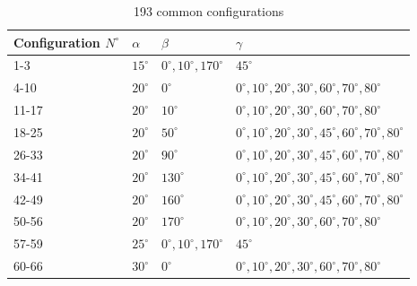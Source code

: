 \begin{table}[h]
    \centering
    \footnotesize
    \caption{193 common configurations}
    \label{tab:193-configurations}
    \begin{tabular}{llll}
        \hline
        \hline
        Configuration $N^\circ$ & $\alpha$   & $\beta$                        & $\gamma$                                                                         \\
        \hline
        1-3                     & $15^\circ$ & $0^\circ, 10^\circ, 170^\circ$ & $45^\circ$                                                                       \\
        \hline
        4-10                    & $20^\circ$ & $0^\circ$                      & $0^\circ, 10^\circ, 20^\circ, 30^\circ, 60^\circ, 70^\circ, 80^\circ $           \\
        \hline
        11-17                   & $20^\circ$ & $10^\circ$                     & $0^\circ, 10^\circ, 20^\circ, 30^\circ, 60^\circ, 70^\circ, 80^\circ $           \\
        \hline
        18-25                   & $20^\circ$ & $50^\circ$                     & $0^\circ, 10^\circ, 20^\circ, 30^\circ, 45^\circ, 60^\circ, 70^\circ, 80^\circ $ \\
        \hline
        26-33                   & $20^\circ$ & $90^\circ$                     & $0^\circ, 10^\circ, 20^\circ, 30^\circ, 45^\circ, 60^\circ, 70^\circ, 80^\circ $ \\
        \hline
        34-41                   & $20^\circ$ & $130^\circ$                    & $0^\circ, 10^\circ, 20^\circ, 30^\circ, 45^\circ, 60^\circ, 70^\circ, 80^\circ $ \\
        \hline
        42-49                   & $20^\circ$ & $160^\circ$                    & $0^\circ, 10^\circ, 20^\circ, 30^\circ, 45^\circ, 60^\circ, 70^\circ, 80^\circ $ \\
        \hline
        50-56                   & $20^\circ$ & $170^\circ$                    & $0^\circ, 10^\circ, 20^\circ, 30^\circ, 60^\circ, 70^\circ, 80^\circ $           \\
        \hline
        57-59                   & $25^\circ$ & $0^\circ, 10^\circ, 170^\circ$ & $45^\circ$                                                                       \\
        \hline
        60-66                   & $30^\circ$ & $0^\circ$                      & $0^\circ, 10^\circ, 20^\circ, 30^\circ, 60^\circ, 70^\circ, 80^\circ $           \\

\end{tabular}
\end{table}
